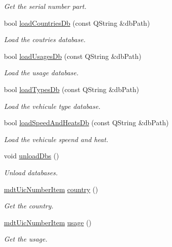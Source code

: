 \begin{DoxyCompactItemize}
\begin{DoxyCompactList}\small\item\em Get the serial number part. \end{DoxyCompactList}\item 
bool \hyperlink{classmdt_uic_number_ad7bb1405db0de8f1d247fa5a7bdb19ce}{loadCountriesDb} (const QString \&dbPath)
\begin{DoxyCompactList}\small\item\em Load the coutries database. \end{DoxyCompactList}\item 
bool \hyperlink{classmdt_uic_number_af496e1fb75f696258287754fe2607561}{loadUsagesDb} (const QString \&dbPath)
\begin{DoxyCompactList}\small\item\em Load the usage database. \end{DoxyCompactList}\item 
bool \hyperlink{classmdt_uic_number_a98c879c7bb7412caac4612a46586b76d}{loadTypesDb} (const QString \&dbPath)
\begin{DoxyCompactList}\small\item\em Load the vehicule type database. \end{DoxyCompactList}\item 
bool \hyperlink{classmdt_uic_number_ab1d08c2ea34f310631866d2e46010363}{loadSpeedAndHeatsDb} (const QString \&dbPath)
\begin{DoxyCompactList}\small\item\em Load the vehicule speend and heat. \end{DoxyCompactList}\item 
void \hyperlink{classmdt_uic_number_a7bb368e5de6a9e7af3a2516eb4282e04}{unloadDbs} ()
\begin{DoxyCompactList}\small\item\em Unload databases. \end{DoxyCompactList}\item 
\hyperlink{classmdt_uic_number_item}{mdtUicNumberItem} \hyperlink{classmdt_uic_number_a69fea97b67a745980ad4386d5ffa9505}{country} ()
\begin{DoxyCompactList}\small\item\em Get the country. \end{DoxyCompactList}\item 
\hyperlink{classmdt_uic_number_item}{mdtUicNumberItem} \hyperlink{classmdt_uic_number_a8e2e1c1be4425b57e0fa60113410bfbc}{usage} ()
\begin{DoxyCompactList}\small\item\em Get the usage. \end{DoxyCompactList}\item 

\end{DoxyCompactItemize}

